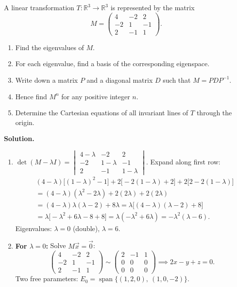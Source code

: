 \documentclass[11pt]{article}
\begin{document}
\begin{exoresolu}
A linear transformation $T:\mathbb{R}^3\to\mathbb{R}^3$ is represented by the matrix
\[
M=\begin{pmatrix} 4 & -2 & 2 \\ -2 & 1 & -1 \\ 2 & -1 & 1 \end{pmatrix}.
\]
\begin{enumerate}
\item Find the eigenvalues of $M$.
\item For each eigenvalue, find a basis of the corresponding eigenspace.
\item Write down a matrix $P$ and a diagonal matrix $D$ such that $M=PDP^{-1}$.
\item Hence find $M^n$ for any positive integer $n$.
\item Determine the Cartesian equations of all invariant lines of $T$ through the origin.
\end{enumerate}
\tcblower
\textbf{Solution.}
\begin{enumerate}
\item $\det(M-\lambda I)=\begin{vmatrix} 4-\lambda & -2 & 2 \\ -2 & 1-\lambda & -1 \\ 2 & -1 & 1-\lambda \end{vmatrix}$.
Expand along first row:
\begin{align*}
&(4-\lambda)\bigl[(1-\lambda)^2-1\bigr]+2\bigl[-2(1-\lambda)+2\bigr]+2\bigl[2-2(1-\lambda)\bigr]\\
&=(4-\lambda)(\lambda^2-2\lambda)+2(2\lambda)+2(2\lambda)\\
&=(4-\lambda)\lambda(\lambda-2)+8\lambda=\lambda\bigl[(4-\lambda)(\lambda-2)+8\bigr]\\
&=\lambda\bigl[-\lambda^2+6\lambda-8+8\bigr]=\lambda(-\lambda^2+6\lambda)=-\lambda^2(\lambda-6).
\end{align*}
Eigenvalues: $\lambda=0$ (double), $\lambda=6$.

\item \textbf{For $\lambda=0$:} Solve $M\vec{x}=\vec{0}$:
\[
\begin{pmatrix} 4 & -2 & 2 \\ -2 & 1 & -1 \\ 2 & -1 & 1 \end{pmatrix}\sim\begin{pmatrix} 2 & -1 & 1 \\ 0 & 0 & 0 \\ 0 & 0 & 0 \end{pmatrix}\implies 2x-y+z=0.
\]
Two free parameters: $E_0=\operatorname{span}\{(1,2,0),\ (1,0,-2)\}$.


\end{enumerate}
\end{exoresolu}
\end{document}
